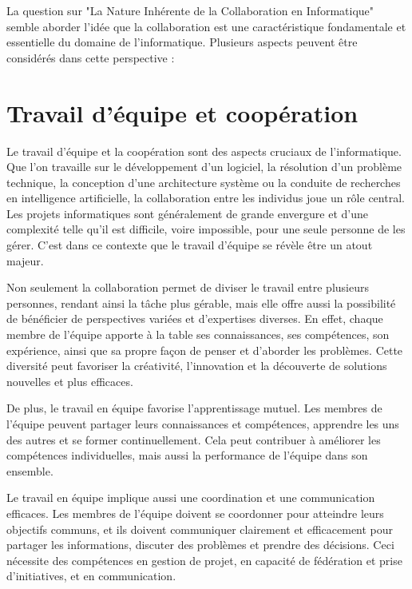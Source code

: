 La question sur "La Nature Inhérente de la Collaboration en Informatique" semble aborder l'idée que la collaboration est une caractéristique fondamentale et essentielle du domaine de l'informatique. Plusieurs aspects peuvent être considérés dans cette perspective :

\section{Travail d'équipe et coopération} 
Le travail d'équipe et la coopération sont des aspects cruciaux de l'informatique. Que l'on travaille sur le développement d'un logiciel, la résolution d'un problème technique, la conception d'une architecture système ou la conduite de recherches en intelligence artificielle, la collaboration entre les individus joue un rôle central. \\

Les projets informatiques sont généralement de grande envergure et d'une complexité telle qu'il est difficile, voire impossible, pour une seule personne de les gérer. C'est dans ce contexte que le travail d'équipe se révèle être un atout majeur.

Non seulement la collaboration permet de diviser le travail entre plusieurs personnes, rendant ainsi la tâche plus gérable, mais elle offre aussi la possibilité de bénéficier de perspectives variées et d'expertises diverses. En effet, chaque membre de l'équipe apporte à la table ses connaissances, ses compétences, son expérience, ainsi que sa propre façon de penser et d'aborder les problèmes. Cette diversité peut favoriser la créativité, l'innovation et la découverte de solutions nouvelles et plus efficaces.

De plus, le travail en équipe favorise l'apprentissage mutuel. Les membres de l'équipe peuvent partager leurs connaissances et compétences, apprendre les uns des autres et se former continuellement. Cela peut contribuer à améliorer les compétences individuelles, mais aussi la performance de l'équipe dans son ensemble.

Le travail en équipe implique aussi une coordination et une communication efficaces. Les membres de l'équipe doivent se coordonner pour atteindre leurs objectifs communs, et ils doivent communiquer clairement et efficacement pour partager les informations, discuter des problèmes et prendre des décisions. Ceci nécessite des compétences en gestion de projet, en capacité de fédération et prise d'initiatives, et en communication.

